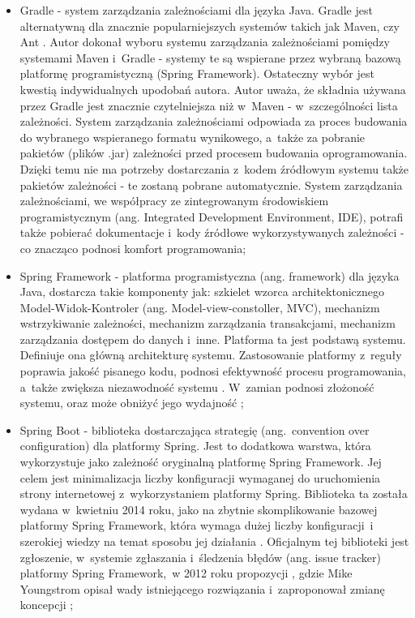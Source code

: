 \begin{itemize}
\medskip
\item Gradle - system zarządzania zależnościami dla języka Java. Gradle jest alternatywną dla znacznie popularniejszych systemów takich jak Maven, czy Ant \cite{EclipseSurvey}. Autor dokonał wyboru systemu zarządzania zależnościami pomiędzy systemami Maven i~Gradle - systemy te są wspierane przez wybraną bazową platformę programistyczną (Spring Framework). Ostateczny wybór jest kwestią indywidualnych upodobań autora. Autor uważa, że składnia używana przez Gradle jest znacznie czytelniejsza niż w~Maven - w~szczególności lista zależności. System zarządzania zależnościami odpowiada za proces budowania do wybranego wspieranego formatu wynikowego, a~także za pobranie pakietów (plików .jar) zależności przed procesem budowania oprogramowania. Dzięki temu nie ma potrzeby dostarczania z~kodem źródłowym systemu także pakietów zależności - te zostaną pobrane automatycznie. System zarządzania zależnościami, we współpracy ze zintegrowanym środowiskiem programistycznym (ang. Integrated Development Environment, IDE), potrafi także pobierać dokumentacje i~kody źródłowe wykorzystywanych zależności - co znacząco podnosi komfort programowania;

\medskip
\item Spring Framework - platforma programistyczna (ang. framework) dla języka Java, dostarcza takie komponenty jak: szkielet wzorca architektonicznego Model-Widok-Kontroler (ang. Model-view-constoller, MVC), mechanizm wstrzykiwanie zależności, mechanizm zarządzania transakcjami, mechanizm zarządzania dostępem do danych i~inne. Platforma ta jest podstawą systemu. Definiuje ona główną architekturę systemu. Zastosowanie platformy z~reguły poprawia jakość pisanego kodu, podnosi efektywność procesu programowania, a~także zwiększa niezawodność systemu \cite{Framework}. W~zamian podnosi złożoność systemu, oraz może obniżyć jego wydajność \cite{Framework};

\medskip
\item Spring Boot - biblioteka dostarczająca strategię  (ang.~convention over configuration) dla platformy Spring. Jest to dodatkowa warstwa, która wykorzystuje jako zależność oryginalną platformę Spring Framework. Jej celem jest minimalizacja liczby konfiguracji wymaganej do uruchomienia strony internetowej z~wykorzystaniem platformy Spring. Biblioteka ta została wydana w~kwietniu 2014 roku, jako  na zbytnie skomplikowanie bazowej platformy Spring Framework, która wymaga dużej liczby konfiguracji~i szerokiej wiedzy na temat sposobu jej działania \cite{SpringIssueBoot}. Oficjalnym  tej biblioteki jest zgłoszenie, w~systemie zgłaszania i~śledzenia błędów (ang. issue tracker) platformy Spring Framework,~w 2012 roku propozycji , gdzie Mike Youngstrom opisał wady istniejącego rozwiązania i~zaproponował zmianę koncepcji \cite{SpringIssueBoot};


\end{itemize}

